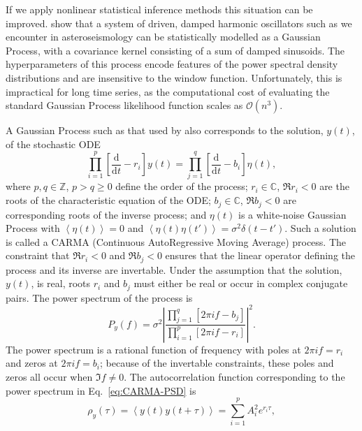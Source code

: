 \documentclass[modern]{aastex61}
\newcommand{\dd}{\mathrm{d}}
\newcommand{\diff}[2]{\frac{\dd #1}{\dd #2}}
\begin{document}
If we apply nonlinear statistical inference methods this situation can be improved. \citet{brewer2009} show that a system of driven, damped harmonic oscillators such as we encounter in asteroseismology can be statistically modelled as a Gaussian Process, with a covariance kernel consisting of a sum of damped sinusoids. The hyperparameters of this process encode features of the power spectral density distributions and are insensitive to the window function. Unfortunately, this is impractical for long time series, as the computational cost of evaluating the standard Gaussian Process likelihood function scales as $\mathcal{O}(n^3)$.

A Gaussian Process such as that used by \citet{brewer2009} also
corresponds to the solution, $y(t)$, of the stochastic ODE
\begin{equation}
  \label{eq:GP-definition}
  \prod_{i=1}^{p} \left[ \diff{}{t} - r_i \right] y(t) = \prod_{j = 1}^{q} \left[ \diff{}{t} - b_i \right] \eta(t),
\end{equation}
where $p, q \in \mathbb{Z}$, $p > q \geq 0$ define the order of the
process; $r_i \in \mathbb{C}$, $\Re r_i < 0$ are the roots of the
characteristic equation of the ODE; $b_j \in \mathbb{C}$,
$\Re b_j < 0$ are corresponding roots of the inverse process; and
$\eta(t)$ is a white-noise Gaussian Process with
$\left\langle \eta(t) \right\rangle = 0$ and
$\left\langle \eta(t) \eta(t') \right\rangle = \sigma^2 \delta\left(t
  - t' \right)$.  Such a solution is called a CARMA (Continuous
AutoRegressive Moving Average) process.  The constraint that
$\Re r_i < 0$ and $\Re b_j < 0$ ensures that the linear operator
defining the process and its inverse are invertable.  Under the
assumption that the solution, $y(t)$, is real, roots $r_i$ and $b_j$
must either be real or occur in complex conjugate pairs.  The power
spectrum of the process is
\begin{equation}
  \label{eq:CARMA-PSD}
  P_y(f) = \sigma^2 \left| \frac{\prod_{j=1}^q \left[ 2 \pi i f - b_j \right]}{\prod_{i=1}^p \left[ 2 \pi i f - r_i \right]} \right|^2.
\end{equation}
The power spectrum is a rational function of frequency with poles at
$2\pi i f = r_i$ and zeros at $2\pi i f = b_i$; because of the
invertable constraints, these poles and zeros all occur when
$\Im f \neq 0$.  The autocorrelation function corresponding to the
power spectrum in Eq.\ \eqref{eq:CARMA-PSD} is
\begin{equation}
  \label{eq:CARMA-ACF}
  \rho_y (\tau) = \left\langle y\left( t \right) y \left( t + \tau \right) \right\rangle = \sum_{i=1}^p A_i^2 e^{r_i \tau},
\end{equation}
\end{document}
